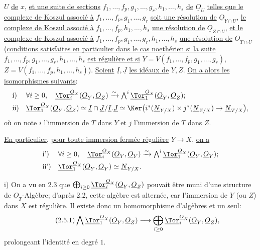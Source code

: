 
\(U\) \uline{de} \(x\), \uline{et une suite de sections} \(f_1,\ldots,f_p,g_1,\ldots,g_r,h_1,\ldots,h_s\) \uline{de} \(\underline{O}_U\) \uline{telles que le complexe de Koszul associé à} \(f_1,\ldots,f_p,g_1,\ldots,g_r\) \uline{soit une résolution de} \(\underline{O}_{Y\cap U}\), \uline{le complexe de Koszul associé à} \(f_1,\ldots,f_p,h_1,\ldots,h_s\) \uline{une résolution de} \(\underline{O}_{Z\cap U}\), \uline{et le complexe de Koszul associé à} \(f_1,\ldots,f_p,g_1,\ldots,g_r,h_1,\ldots,h_s\) \uline{une résolution de} \(\underline{O}_{T\cap U}\) (\uline{conditions satisfaites en particulier dans le cas noethérien si la suite} \(f_1,\ldots,f_p,g_1,\ldots,g_r,h_1,\ldots,h_s\) \uline{est régulière et si} \(Y=V(f_1,\ldots,f_p,g_1,\ldots,g_r)\), \(Z=V(f_1,\ldots,f_p,h_1,\ldots,h_s)\)). \uline{Soient} \(\underline{I},\underline{J}\) \uline{les idéaux de} \(Y,Z\). \uline{On a alors les isomorphismes suivants}:
\[
\begin{array}{ll}
\text{i)}& \forall i\ge0,\quad
\underline{\Tor}_i^{\underline{O}_X}(\underline{O}_Y,\underline{O}_Z)\xrightarrow{\sim}
\bigwedge^i\underline{\Tor}_1^{\underline{O}_X}(\underline{O}_Y,\underline{O}_Z);\\[0.8ex]
\text{ii)}&
\underline{\Tor}_1^{\underline{O}_X}(\underline{O}_Y,\underline{O}_Z)\simeq
\underline{I}\cap \underline{J}/\underline{I}.\underline{J}\simeq
\Ker\bigl(i^*(\underline{N}_{Y/X})\times j^*(\underline{N}_{Z/X})\to \underline{N}_{T/X}\bigr),
\end{array}
\]
\uline{où on note} \(i\) \uline{l'immersion de} \(T\) \uline{dans} \(Y\) \uline{et} \(j\) \uline{l'immersion de} \(T\) \uline{dans} \(Z\).

\uline{En particulier}, \uline{pour toute immersion fermée régulière} \(Y\to X\), \uline{on a}
\[
\begin{array}{ll}
\text{i')}& \forall i\ge0,\quad
\underline{\Tor}_i^{\underline{O}_X}(\underline{O}_Y,\underline{O}_Y)\xrightarrow{\sim}
\bigwedge^i\underline{\Tor}_1^{\underline{O}_X}(\underline{O}_Y,\underline{O}_Y);\\[0.8ex]
\text{ii')}&
\underline{\Tor}_1^{\underline{O}_X}(\underline{O}_Y,\underline{O}_Y)\simeq \underline{N}_{Y/X}.
\end{array}
\]

i) On a vu en 2.3 que \(\bigoplus_{i\ge0}\underline{\Tor}_i^{\underline{O}_X}(\underline{O}_Y,\underline{O}_Z)\) pouvait être muni d'une structure de \(\underline{O}_T\)-Algèbre; d'après 2.2, cette algèbre est alternée, car l'immersion de \(Y\) (ou \(Z\)) dans \(X\) est régulière. Il existe donc un homomorphisme d'algèbres et un seul:
\begin{equation}\tag{2.5.1}
\bigwedge \underline{\Tor}_1^{\underline{O}_X}(\underline{O}_Y,\underline{O}_Z)\longrightarrow
\bigoplus_{i\ge0}\underline{\Tor}_i^{\underline{O}_X}(\underline{O}_Y,\underline{O}_Z),
\end{equation}
prolongeant l'identité en degré \(1\).

